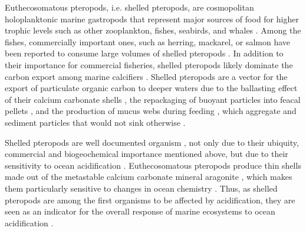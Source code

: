 





Euthecosomatous pteropods, i.e. shelled pteropods, are cosmopolitan holoplanktonic marine gastropods \citep{Bednarsek2012PteropodDistribution,SuarezMorales2009Gastropods} that represent major sources of food for higher trophic levels such as other zooplankton, fishes, seabirds, and whales \citep[][]{FalkPetersen2001Trophic,Hunt2008TopPredators}.
Among the fishes, commercially important ones, such as herring, mackarel, or salmon have been reported to consume large volumes of shelled pteropods \citep{LeBrasseur1966FishPteropods,lalli1989pelagic}.
In addition to their importance for commercial fisheries, shelled pteropods likely dominate the carbon export among marine calcifiers \citep{Buitenhuis2019CalciteExportPteropods}. Shelled pteropods are a vector for the export of particulate organic carbon to deeper waters due to the ballasting effect of their calcium carbonate shells \citep{Klaas2002Ballast}, the repackaging of buoyant particles into feacal pellets \citep{Treguer2003FecalPellets,Manno2009FeacalPellets}, and the production of mucus webs during feeding \citep{Gilmer1972FeedingBehaviour}, which aggregate and sediment particles that would not sink otherwise \citep{Noji1997Aggregation}.

Shelled pteropods are well documented organism \citep{Bednarsek2017ApplicationPteropodShell}, not only due to their ubiquity, commercial and biogeochemical importance mentioned above, but due to their sensitivity to ocean acidification \citep{Bednarsek2017ApplicationPteropodShell,Manno2017ReviewPteropodVulnerability}.
Euthecosomatous pteropods produce thin shells made out of the metastable calcium carbonate mineral aragonite \citep{Mucci1983Metastable,lalli1989pelagic}, which makes them particularly sensitive to changes in ocean chemistry \citep[][]{Orr2005Acidification,Bednarsek2014LimacinaHelicina}.
Thus, as shelled pteropods are among the first organisms to be affected by acidification, they are seen as an indicator for the overall response of marine ecosystems to ocean acidification \citep{Bednarsek2017ApplicationPteropodShell}. 

